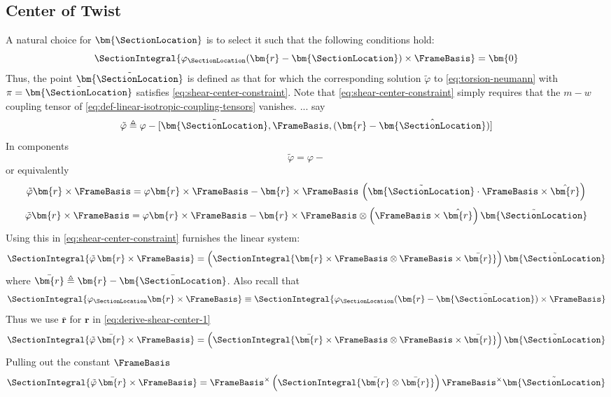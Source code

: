 \subsection{Center of Twist}
A natural choice for \(\bm{\SectionLocation}\) is to select it such that the following conditions hold:
\begin{equation}
    \SectionIntegral{\varphi_{\SectionLocation} (\bm{r}-\bm{\SectionLocation})\times\FrameBasis} = \bm{0}
    \label{eq:shear-center-constraint}
\end{equation}
Thus, the point \(\tilde{\bm{\SectionLocation}}\) is defined as that for which the corresponding solution \(\tilde{\varphi}\) to \cref{eq:torsion-neumann} with \(\pi = \tilde{\bm{\SectionLocation}}\) satisfies \cref{eq:shear-center-constraint}. 
Note that \cref{eq:shear-center-constraint} simply requires that the \(m-w\) coupling tensor of \cref{eq:def-linear-isotropic-coupling-tensors} vanishes.
...
say
\[
\tilde{\varphi} \triangleq \varphi - [\tilde{\bm{\SectionLocation}} , \FrameBasis, (\bm{r} - \hat{\bm{\SectionLocation}})]
\]
In components 
\[
\tilde{\varphi} = \varphi - 
\]
or equivalently
\[
\tilde{\varphi}\bm{r}\times\FrameBasis = \varphi\bm{r}\times\FrameBasis - \bm{r}\times\FrameBasis \, \left(\tilde{\bm{\SectionLocation}} \cdot \FrameBasis \times \hat{\bm{r}}\right)
\]
\[
\tilde{\varphi}\bm{r}\times\FrameBasis = \varphi\bm{r}\times\FrameBasis - \bm{r}\times\FrameBasis \otimes \left(\FrameBasis \times \hat{\bm{r}}\right) \tilde{\bm{\SectionLocation}}
\]
Using this in \cref{eq:shear-center-constraint} furnishes the linear system:
\begin{equation}
    \SectionIntegral{\tilde{\varphi}\,\bm{r}\times\FrameBasis}
    =\left(\SectionIntegral{\bm{r}\times\FrameBasis\otimes\FrameBasis\times\bar{\bm{r}}} \right)\tilde{\bm{\SectionLocation}}
    \label{eq:derive-shear-center-1}
\end{equation}
where \(\bar{\bm{r}} \triangleq \bm{r} - \bar{\bm{\SectionLocation}}\).
Also recall that 
\[
\SectionIntegral{\varphi_{\SectionLocation} \bm{r}\times\FrameBasis} 
\equiv \SectionIntegral{\varphi_{\SectionLocation} (\bm{r}-\bar{\bm{\SectionLocation}})\times\FrameBasis} 
\]
Thus we use \(\bar{\bm{r}}\) for \(\bm{r}\) in \cref{eq:derive-shear-center-1}
\begin{equation}
    \SectionIntegral{\tilde{\varphi}\,\bar{\bm{r}}\times\FrameBasis}
    =\left(\SectionIntegral{\bar{\bm{r}}\times\FrameBasis\otimes\FrameBasis\times\bar{\bm{r}}} \right)\tilde{\bm{\SectionLocation}}
\end{equation}
Pulling out the constant \(\FrameBasis\) 
\begin{equation}
    \SectionIntegral{\tilde{\varphi}\,\bar{\bm{r}}\times\FrameBasis}
    =\FrameBasis^{\times}\left(\SectionIntegral{\bar{\bm{r}}\otimes\bar{\bm{r}}} \right)\FrameBasis^\times\tilde{\bm{\SectionLocation}}
\end{equation}



